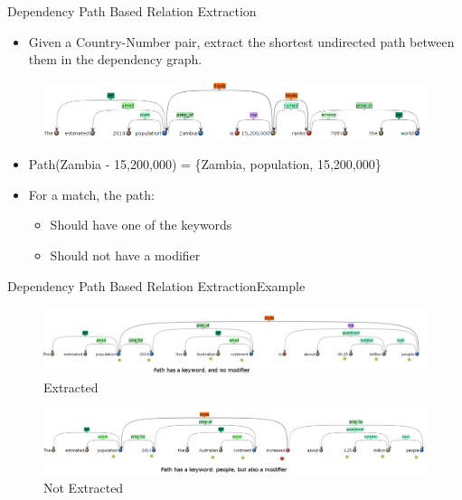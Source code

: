 \documentclass{beamer}
\begin{document}
\begin{frame}{Dependency Path Based Relation Extraction}
 
\begin{itemize}
 \item Given a Country-Number pair, extract the shortest undirected path between them in the dependency graph.
\end{itemize}
 \begin{figure}[h]
 \centering
 \includegraphics[bb=0 0 990 149,scale=0.3]{./dep.png}
\end{figure}
\begin{itemize}
 \item Path(Zambia - 15,200,000) = \{Zambia, population, 15,200,000\}
  \item For a match, the path:
  \begin{itemize}
   \item Should have one of the keywords
   \item Should not have a modifier
  \end{itemize}
 \end{itemize}
\end{frame}

\begin{frame}{Dependency Path Based Relation Extraction}{Example}
\begin{figure}[h]
 \centering
 \includegraphics[bb=0 0 1292 228,scale=0.25]{./dep_pos.png}
 \caption*{Extracted}
\end{figure}
\begin{figure}[h]
 \centering
 \includegraphics[bb=0 0 1280 219,scale=0.25]{./dep_neg.png}
 \caption*{Not Extracted}
\end{figure}

\end{frame}
\end{document}

